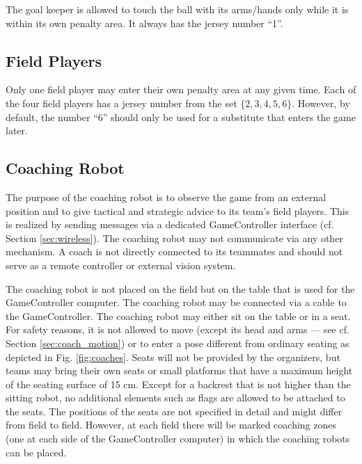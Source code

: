 \documentclass[12pt]{article}
\newcommand{\cf}{\mbox{cf.}\xspace}
\begin{document}
The goal keeper is allowed to touch the ball with its arms/hands only while it is within its own penalty area. It always has the jersey number ``1''.

\subsection{Field Players}
\label{sec:field_players}
Only one field player may enter their own penalty area at any given time. Each of the four field players has a jersey number from the set $\{2, 3, 4, 5, 6\}$. However, by default, the number ``6'' should only be used for a substitute that enters the game later.

\subsection{Coaching Robot}
\label{sec:coaching_robot}

The purpose of the coaching robot is to observe the game from an external position and to give tactical and strategic advice to its team's field players. This is realized by sending messages via a dedicated GameController interface (\cf Section \ref{sec:wireless}). The coaching robot may not communicate via any other mechanism.  A coach is not directly connected to its teammates and should not serve as a remote controller or external vision system.

The coaching robot is not placed on the field but on the table that is used for the GameController computer.  The coaching robot may be connected via a cable to the GameController. The coaching robot may either sit on the table or in a seat. For safety reasons, it is not allowed to move (except its head and arms --- see \cf Section \ref{sec:coach_motion}) or to enter a pose different from ordinary seating as depicted in Fig. \ref{fig:coaches}.  Seats will not be provided by the organizers, but teams may bring their own seats or small platforms that have a maximum height of the seating surface of 15 cm. Except for a backrest that is not higher than the sitting robot, no additional elements such as flags are allowed to be attached to the seats. The positions of the seats are not specified in detail and might differ from field to field. However, at each field there will be marked coaching zones (one at each side of the GameController computer) in which the coaching robots can be placed.
\end{document}
